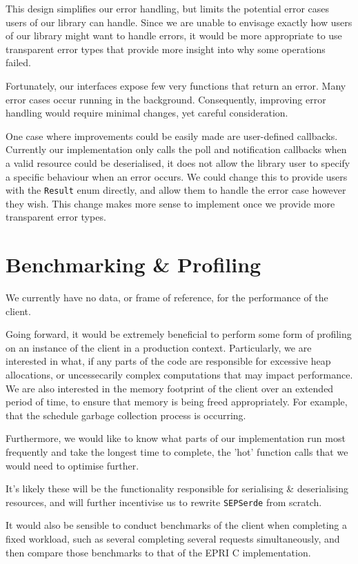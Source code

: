 This design simplifies our error handling, but limits the potential error cases users of our library can handle. Since we are unable to envisage exactly how users of our library might want to handle errors, it would be more appropriate to use transparent error types that provide more insight into why some operations failed.

Fortunately, our interfaces expose few very functions that return an error. Many error cases occur running in the background. Consequently, improving error handling would require minimal changes, yet careful consideration.

One case where improvements could be easily made are user-defined callbacks. Currently our implementation only calls the poll and notification callbacks when a valid resource could be deserialised, it does not allow the library user to specify a specific behaviour when an error occurs. We could change this to provide users with the \texttt{Result} enum directly, and allow them to handle the error case however they wish. This change makes more sense to implement once we provide more transparent error types.   

\section{Benchmarking \& Profiling}
We currently have no data, or frame of reference, for the performance of the client. 

Going forward, it would be extremely beneficial to perform some form of profiling on an instance of the client in a production context. Particularly, we are interested in what, if any parts of the code are responsible for excessive heap allocations, or uncessecarily complex computations that may impact performance.
We are also interested in the memory footprint of the client over an extended period of time, to ensure that memory is being freed appropriately. For example, that the schedule garbage collection process is occurring. 

Furthermore, we would like to know what parts of our implementation run most frequently and take the longest time to complete, the 'hot' function calls that we would need to optimise further. 

It's likely these will be the functionality responsible for serialising \& deserialising resources, and will further incentivise us to rewrite \texttt{SEPSerde} from scratch.

It would also be sensible to conduct benchmarks of the client when completing a fixed workload, such as several completing several requests simultaneously, and then compare those benchmarks to that of the EPRI C implementation.

